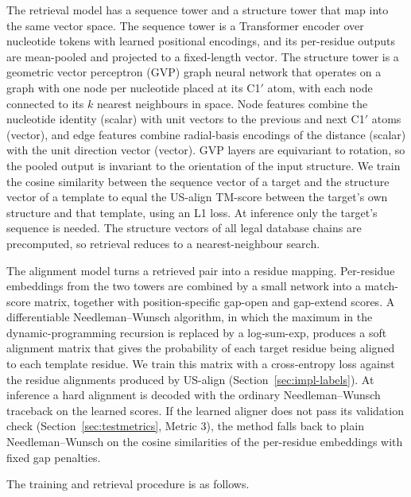 \documentclass{FastFyp}
\begin{document}
The retrieval model has a sequence tower and a structure tower that map into the same vector space. The sequence tower is a Transformer encoder over nucleotide tokens with learned positional encodings, and its per-residue outputs are mean-pooled and projected to a fixed-length vector. The structure tower is a geometric vector perceptron (GVP) graph neural network \cite{jing2021gvp} that operates on a graph with one node per nucleotide placed at its C1$'$ atom, with each node connected to its $k$ nearest neighbours in space. Node features combine the nucleotide identity (scalar) with unit vectors to the previous and next C1$'$ atoms (vector), and edge features combine radial-basis encodings of the distance (scalar) with the unit direction vector (vector). GVP layers are equivariant to rotation, so the pooled output is invariant to the orientation of the input structure. We train the cosine similarity between the sequence vector of a target and the structure vector of a template to equal the US-align TM-score between the target's own structure and that template, using an L1 loss. At inference only the target's sequence is needed. The structure vectors of all legal database chains are precomputed, so retrieval reduces to a nearest-neighbour search.

The alignment model turns a retrieved pair into a residue mapping. Per-residue embeddings from the two towers are combined by a small network into a match-score matrix, together with position-specific gap-open and gap-extend scores. A differentiable Needleman--Wunsch algorithm, in which the maximum in the dynamic-programming recursion is replaced by a log-sum-exp, produces a soft alignment matrix that gives the probability of each target residue being aligned to each template residue. We train this matrix with a cross-entropy loss against the residue alignments produced by US-align (Section~\ref{sec:impl-labels}). At inference a hard alignment is decoded with the ordinary Needleman--Wunsch traceback on the learned scores. If the learned aligner does not pass its validation check (Section~\ref{sec:testmetrics}, Metric 3), the method falls back to plain Needleman--Wunsch on the cosine similarities of the per-residue embeddings with fixed gap penalties.

The training and retrieval procedure is as follows.
\end{document}

